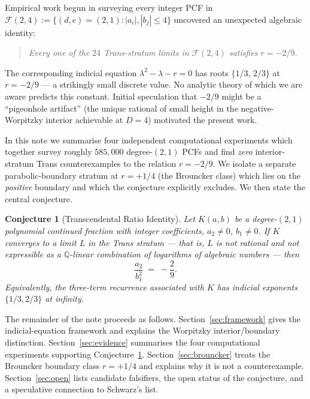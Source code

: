 \documentclass[11pt]{amsart}
\newtheorem{conjecture}[theorem]{Conjecture}
\theoremstyle{definition}
\theoremstyle{remark}
\newcommand{\FF}{\mathcal{F}}
\begin{document}
Empirical work begun in \cite{PCF25} surveying every integer PCF in
$\FF(2,4) := \{(d,e)=(2,1) : |a_i|, |b_j| \le 4\}$ uncovered an
unexpected algebraic identity:
\begin{quote}
\itshape Every one of the $24$ Trans-stratum limits in $\FF(2,4)$
satisfies $r = -2/9$.
\end{quote}
The corresponding indicial equation $\lambda^2 - \lambda - r = 0$
has roots $\{1/3,\,2/3\}$ at $r = -2/9$ --- a strikingly small
discrete value.  No analytic theory of which we are aware predicts
this constant.  Initial speculation that $-2/9$ might be a
``pigeonhole artifact'' (the unique rational of small height in the
negative-Worpitzky interior achievable at $D = 4$) motivated the
present work.

In this note we summarise four independent computational experiments
which together survey roughly $585{,}000$ degree-$(2,1)$ PCFs and
find \emph{zero} interior-stratum Trans counterexamples to the
relation $r = -2/9$.  We isolate a separate parabolic-boundary stratum at
$r = +1/4$ (the Brouncker class) which lies on the \emph{positive}
boundary and which the conjecture explicitly excludes.  We then
state the central conjecture.

\begin{conjecture}[Transcendental Ratio Identity]\label{conj:tri}
Let $K(a, b)$ be a degree-$(2,1)$ polynomial continued fraction with
integer coefficients, $a_2 \ne 0$, $b_1 \ne 0$.  If $K$ converges to
a limit $L$ in the Trans stratum --- that is, $L$ is not rational and
not expressible as a $\mathbb Q$-linear combination of logarithms of
algebraic numbers --- then
\begin{equation}\label{eq:conj}
  \frac{a_2}{b_1^2} \;=\; -\frac{2}{9}.
\end{equation}
Equivalently, the three-term recurrence associated with $K$ has
indicial exponents $\{1/3, 2/3\}$ at infinity.
\end{conjecture}

The remainder of the note proceeds as follows.
Section~\ref{sec:framework} gives the indicial-equation framework
and explains the Worpitzky interior/boundary distinction.
Section~\ref{sec:evidence} summarises the four computational
experiments supporting Conjecture~\ref{conj:tri}.
Section~\ref{sec:brouncker} treats the Brouncker boundary class
$r = +1/4$ and explains why it is not a counterexample.
Section~\ref{sec:open} lists candidate falsifiers, the open status
of the conjecture, and a speculative connection to Schwarz's list.
\end{document}
